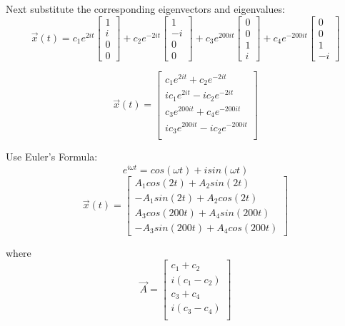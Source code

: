 \documentclass[11pt, oneside]{article}   	%
\begin{document}
Next substitute the corresponding eigenvectors and eigenvalues:\\

\[
\vec{x}(t) = c_1e^{2it}
\left[
\begin{array}{ccc}
1 \\ i \\ 0 \\ 0
\end{array}
\right]
+ c_2e^{-2it}
\left[
\begin{array}{ccc}
1 \\ -i \\ 0 \\ 0
\end{array}
\right]
+ c_3e^{200it}
\left[
\begin{array}{ccc}
0 \\ 0 \\ 1 \\ i
\end{array}
\right]
+ c_4e^{-200it}
\left[
\begin{array}{ccc}
0 \\ 0 \\ 1 \\ -i
\end{array}
\right]
\]



\[
\vec{x}(t) = 
\left[
\begin{array}{ccc}
c_1e^{2it} + c_2e^{-2it}\\
ic_1e^{2it} - ic_2e^{-2it}\\
c_3e^{200it} + c_4e^{-200it}\\
ic_3e^{200it} - ic_2e^{-200it}\\
\end{array}
\right]
\]


Use Euler's Formula: \\
\[
e^{i\omega t} = cos(\omega t) + isin(\omega t)
\]
\[
\vec{x}(t) = 
\left[
\begin{array}{ccc}
 A_1cos(2t) + A_2sin(2t) \\ 
 -A_1sin(2t) + A_2cos(2t) \\
 A_3cos(200t) + A_4sin(200t) \\
-A_3sin(200t) + A_4cos(200t)
\end{array}
\right]
\]

	where\\

\[
\vec{A} = 
\left[
\begin{array}{ccc}
c_1 + c_2 \\
 i(c_1 - c_2)\\
 c_3 + c_4\\
 i(c_3 - c_4)\\
\end{array}
\right]
\]
\end{document}
